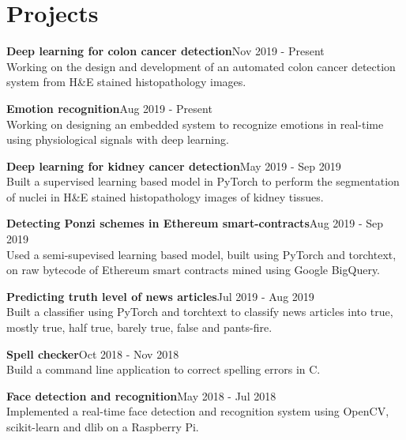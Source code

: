 \documentclass[letterpaper]{article}
\renewenvironment{itemize}{
  \begin{list}{}{
    \setlength{\leftmargin}{1.5em}
  }
}{
  \end{list}
}
\begin{document}
\section*{Projects}
  \begin{itemize}
    \item
    \textbf{Deep learning for colon cancer detection}\hfill{\textcolor{black!80}{\small{Nov 2019 - Present}}}\\
    Working on the design and development of an automated colon cancer detection system from H\&E stained histopathology images.

    \item
    \textbf{Emotion recognition}\hfill{\textcolor{black!80}{\small{Aug 2019 - Present}}}\\
    Working on designing an embedded system to recognize emotions in real-time using physiological signals with deep learning.

    \item
    \textbf{Deep learning for kidney cancer detection}\hfill{\textcolor{black!80}{\small{May 2019 - Sep 2019}}}\\
    Built a supervised learning based model in PyTorch to perform the segmentation of nuclei in H\&E stained histopathology images of kidney tissues.

    \item
    \textbf{Detecting Ponzi schemes in Ethereum smart-contracts}\hfill{\textcolor{black!80}{\small{Aug 2019 - Sep 2019}}}\\
    Used a semi-supevised learning based model, built using PyTorch and torchtext, on raw bytecode of Ethereum smart contracts mined using Google BigQuery.

    \item
    \textbf{Predicting truth level of news articles}\hfill{\textcolor{black!80}{\small{Jul 2019 - Aug 2019}}}\\
    Built a classifier using PyTorch and torchtext to classify news articles into true, mostly true, half true, barely true, false and pants-fire.

    \item
    \textbf{Spell checker}\hfill{\textcolor{black!80}{\small{Oct 2018 - Nov 2018}}}\\
    Build a command line application to correct spelling errors in C.

    \item
    \textbf{Face detection and recognition}\hfill{\textcolor{black!80}{\small{May 20}18 - Jul 2018}}\\
    Implemented a real-time face detection and recognition system using OpenCV, scikit-learn and dlib on a Raspberry Pi.

  \end{itemize}
\end{document}
